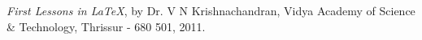 %
%
%
\clearpage
{}
%
%
\begin{thebibliography}{99}
%
{\em First Lessons in \LaTeX}, by Dr. V N Krishnachandran, 
Vidya Academy of Science \& Technology, 
Thrissur - 680 501, 2011.
%
\end{thebibliography}
%
%
%

%
%
%
%
